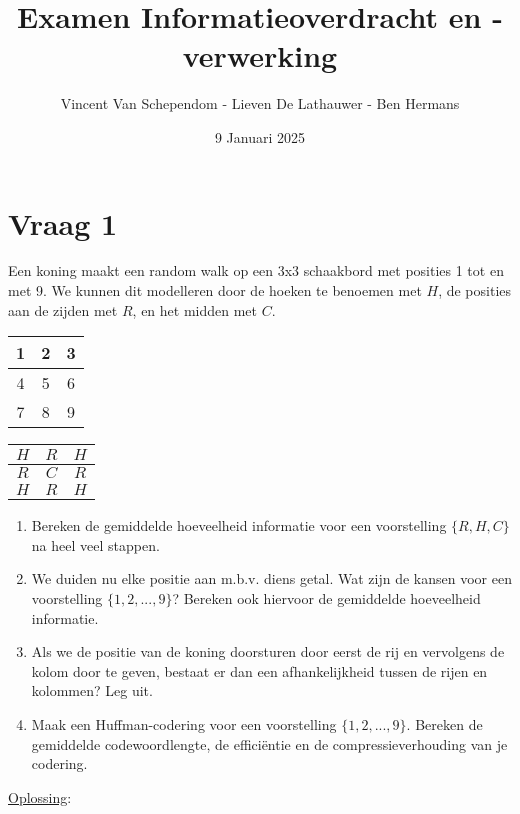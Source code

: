 \documentclass[kulak]{kulakarticle}
\title{Examen Informatieoverdracht en -verwerking}
\author{Vincent Van Schependom - Lieven De Lathauwer - Ben Hermans}
\date{9 Januari 2025}
\begin{document}
	\maketitle

	\section*{Vraag 1}

	Een koning maakt een random walk op een 3x3 schaakbord met posities 1 tot en met 9. We kunnen dit modelleren door de hoeken te benoemen met \(H\), de posities aan de zijden met \(R\), en het midden met \(C\).

	\renewcommand{\arraystretch}{1.5}
	\begin{table}[h!]
		\centering
		\begin{tabular}{|c|c|c|}
			\hline
			1 & 2 & 3 \\
			\hline
			4 & 5 & 6 \\
			\hline
			7 & 8 & 9 \\
			\hline
		\end{tabular}
		\hspace{2cm}
		\begin{tabular}{|c|c|c|}
			\hline
			\(H\) & \(R\) & \(H\) \\
			\hline
			\(R\) & \(C\) & \(R\) \\
			\hline
			\(H\) & \(R\) & \(H\) \\
			\hline
		\end{tabular}
	\end{table}

	\begin{enumerate}
		\item Bereken de gemiddelde hoeveelheid informatie voor een voorstelling \(\{R,H,C\}\) na heel veel stappen.
		\item We duiden nu elke positie aan m.b.v. diens getal. Wat zijn de kansen voor een voorstelling \(\{1,2,...,9\}\)? Bereken ook hiervoor de gemiddelde hoeveelheid informatie.
		\item Als we de positie van de koning doorsturen door eerst de rij en vervolgens de kolom door te geven, bestaat er dan een afhankelijkheid tussen de rijen en kolommen? Leg uit.
		\item Maak een Huffman-codering voor een voorstelling \(\{1,2,...,9\}\). Bereken de gemiddelde codewoordlengte, de efficiëntie en de compressieverhouding van je codering.
	\end{enumerate}

	\underline{Oplossing}:
\end{document}
